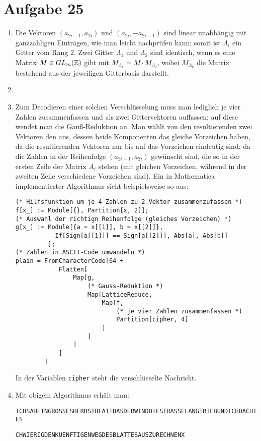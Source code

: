 \section*{Aufgabe 25}
\begin{enumerate}[(1)]
	\item Die Vektoren $(a_{2 i - 1}, a_{2 i})$ und $(a_{2 i},-a_{2 i -
	1})$ sind linear unabhängig mit ganzzahligen Einträgen, wie man leicht
	nachprüfen kann; somit ist $\Lambda_i$ ein Gitter vom Rang $2$. Zwei
	Gitter $\Lambda_1$ und $\Lambda_2$ sind identisch, wenn es eine Matrix
	$M \in GL_m(\mathbb{Z})$ gibt mit $M_{\Lambda_1} = M \cdot M_{\Lambda_2}$, wobei
	$M_{\Lambda_k}$ die Matrix bestehend aus der jeweiligen Gitterbasis
	darstellt.
	\item 
	\item Zum Decodieren einer solchen Verschlüsselung muss man lediglich
	je vier Zahlen zusammenfassen und als zwei Gittervektoren auffassen;
	auf diese wendet man die Gauß-Reduktion an. Man wählt von den
	resultierenden zwei Vektoren den aus, dessen beide Komponenten das
	gleiche Vorzeichen haben, da die resultierenden Vektoren nur bis auf
	das Vorzeichen eindeutig sind; da die Zahlen in der Reihenfolge
	$(a_{2i-1}, a_{2i})$ gewünscht sind, die so in der  ersten Zeile der
	Matrix $A_i$ stehen (mit gleichen Vorzeichen, während in der zweiten Zeile
	verschiedene Vorzeichen sind).  Ein in Mathematica implementierter
	Algorithmus sieht beispielsweise so aus:
\begin{lstlisting}
(* Hilfsfunktion um je 4 Zahlen zu 2 Vektor zusammenzufassen *)
f[x_] := Module[{}, Partition[x, 2]];
(* Auswahl der richtign Reihenfolge (gleiches Vorzeichen) *)
g[x_] := Module[{a = x[[1]], b = x[[2]]}, 
           If[Sign[a[[1]]] == Sign[a[[2]]], Abs[a], Abs[b]]
         ];
(* Zahlen in ASCII-Code umwandeln *)
plain = FromCharacterCode[64 +
            Flatten[
                Map[g, 
                    (* Gauss-Reduktion *)
                    Map[LatticeReduce, 
                        Map[f,
                            (* je vier Zahlen zusammenfassen *)
                            Partition[cipher, 4]
                        ]
                    ]
                ]
            ]
        ]
\end{lstlisting}
	In der Variablen \verb/cipher/ steht die verschlüsselte Nachricht.
	\item Mit obigem Algorithmus erhält man:

	\verb/ICHSAHEINGROSSESHERBSTBLATTDASDERWINDDIESTRASSELANGTRIEBUNDICHDACHTES/

	\verb/CHWIERIGDENKUENFTIGENWEGDESBLATTESAUSZURECHNENX/
\end{enumerate}
